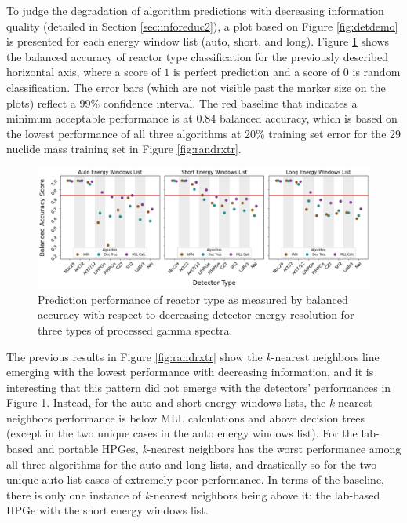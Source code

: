 
To judge the degradation of algorithm predictions with decreasing information
quality (detailed in Section \ref{sec:inforeduc2}), a plot based on Figure
\ref{fig:detdemo} is presented for each energy window list (auto, short, and
long).  Figure \ref{fig:rxtr} shows the balanced accuracy of reactor type
classification for the previously described horizontal axis, where a score of
$1$ is perfect prediction and a score of $0$ is random classification. The
error bars (which are not visible past the marker size on the plots) reflect a
99\% confidence interval.  The red baseline that indicates a minimum acceptable
performance is at 0.84 balanced accuracy, which is based on the lowest
performance of all three algorithms at 20\% training set error for the 29
nuclide mass training set in Figure \ref{fig:randrxtr}.  

\begin{figure}[!htb]
  \centering
  \includegraphics[width=\textwidth]{./chapters/exp2/detector_preds_wrt_enlist_BalAcc_rxtr.png}
  \caption[Prediction performance of reactor type classification with decreasing
           detector energy resolution]
          {Prediction performance of reactor type as measured by balanced 
           accuracy with respect to decreasing detector energy resolution 
           for three types of processed gamma spectra.}
  \label{fig:rxtr}
\end{figure}

The previous results in Figure \ref{fig:randrxtr} show the \textit{k}-nearest
neighbors line emerging with the lowest performance with decreasing
information, and it is interesting that this pattern did not emerge with the
detectors' performances in Figure \ref{fig:rxtr}.  Instead, for the auto and
short energy windows lists, the \textit{k}-nearest neighbors performance is
below \gls{MLL} calculations and above decision trees (except in the two unique
cases in the auto energy windows list).  For the lab-based and portable
\gls{HPGe}s, \textit{k}-nearest neighbors has the worst performance among all
three algorithms for the auto and long lists, and drastically so for the two
unique auto list cases of extremely poor performance.  In terms of the
baseline, there is only one instance of \textit{k}-nearest neighbors being
above it: the lab-based \gls{HPGe} with the short energy windows list. 

